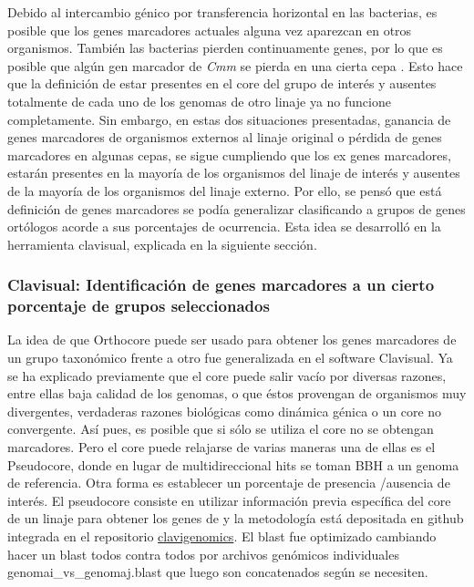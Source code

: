 \documentclass[12pt,twoside]{reedthesis}
\begin{document}
  Debido al intercambio génico por transferencia horizontal en las
  bacterias, es posible que los genes marcadores actuales alguna vez
  aparezcan en otros organismos. También las bacterias pierden
  continuamente genes, por lo que es posible que algún gen marcador de
  \emph{Cmm} se pierda en una cierta cepa . Esto hace que la definición de
  estar presentes en el core del grupo de interés y ausentes totalmente de
  cada uno de los genomas de otro linaje ya no funcione completamente. Sin
  embargo, en estas dos situaciones presentadas, ganancia de genes
  marcadores de organismos externos al linaje original o pérdida de genes
  marcadores en algunas cepas, se sigue cumpliendo que los ex genes
  marcadores, estarán presentes en la mayoría de los organismos del linaje
  de interés y ausentes de la mayoría de los organismos del linaje
  externo. Por ello, se pensó que está definición de genes marcadores se
  podía generalizar clasificando a grupos de genes ortólogos acorde a sus
  porcentajes de ocurrencia. Esta idea se desarrolló en la herramienta
  clavisual, explicada en la siguiente sección.
  
  \subsubsection{Clavisual: Identificación de genes marcadores a un cierto
  porcentaje de grupos
  seleccionados}\label{clavisual-identificacion-de-genes-marcadores-a-un-cierto-porcentaje-de-grupos-seleccionados}
  
  La idea de que Orthocore puede ser usado para obtener los genes
  marcadores de un grupo taxonómico frente a otro fue generalizada en el
  software Clavisual. Ya se ha explicado previamente que el core puede
  salir vacío por diversas razones, entre ellas baja calidad de los
  genomas, o que éstos provengan de organismos muy divergentes, verdaderas
  razones biológicas como dinámica génica o un core no convergente. Así
  pues, es posible que si sólo se utiliza el core no se obtengan
  marcadores. Pero el core puede relajarse de varias maneras una de ellas
  es el Pseudocore, donde en lugar de multidireccional hits se toman BBH a
  un genoma de referencia. Otra forma es establecer un porcentaje de
  presencia /ausencia de interés. El pseudocore consiste en utilizar
  información previa específica del core de un linaje para obtener los
  genes de y la metodología está depositada en github integrada en el
  repositorio
  \href{https://github.com/nselem/clavigenomics}{clavigenomics}. El blast
  fue optimizado cambiando hacer un blast todos contra todos por archivos
  genómicos individuales genomai\_vs\_genomaj.blast que luego son
  concatenados según se necesiten.
  
\end{document}
